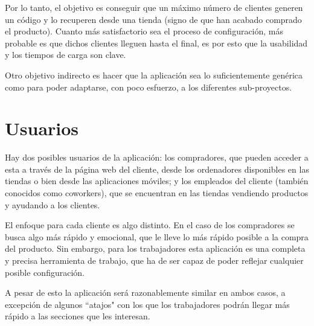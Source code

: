 Por lo tanto, el objetivo es conseguir que un máximo número de clientes generen un código y lo recuperen desde una tienda (signo de que han acabado comprado el producto). Cuanto más satisfactorio sea el proceso de configuración, más probable es que dichos clientes lleguen hasta el final, es por esto que la usabilidad y los tiempos de carga son clave.

Otro objetivo indirecto es hacer que la aplicación sea lo suficientemente genérica como para poder adaptarse, con poco esfuerzo, a los diferentes sub-proyectos.

\section{Usuarios}
Hay dos posibles usuarios de la aplicación: los compradores, que pueden acceder a esta a través de la página web del cliente, desde los ordenadores disponibles en las tiendas o bien desde las aplicaciones móviles; y los empleados del cliente (también conocidos como coworkers), que se encuentran en las tiendas vendiendo productos y ayudando a los clientes.

El enfoque para cada cliente es algo distinto. En el caso de los compradores se busca algo más rápido y emocional, que le lleve lo más rápido posible a la compra del producto. Sin embargo, para los trabajadores esta aplicación es una completa y precisa herramienta de trabajo, que ha de ser capaz de poder reflejar cualquier posible configuración.

A pesar de esto la aplicación será razonablemente similar en ambos casos, a excepción de algunos ``atajos" con los que los trabajadores podrán llegar más rápido a las secciones que les interesan.
